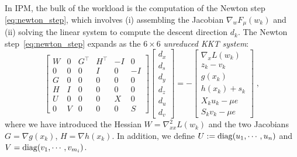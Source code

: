 In IPM, the bulk of the workload is the computation of the Newton
step \eqref{eq:newton_step}, which involves (i) assembling the Jacobian
$\nabla_w F_\mu(w_k)$ and (ii) solving the linear system to compute
the descent direction $d_k$.
The Newton step~\eqref{eq:newton_step} expands as the $6 \times 6$
\emph{unreduced KKT system}:
\begin{equation}
  \label{eq:kkt:unreduced}
  \tag{$K_3$}
  \begin{bmatrix}
    W & 0 & G^\top & H^\top & -I & 0 \\
    0 & 0 & 0 & I & 0 & -I \\
    G & 0 & 0 & 0 & 0 & 0 \\
    H & I & 0 & 0 & 0 & 0 \\
    U & 0 & 0 & 0 & X & 0 \\
    0 & V & 0 & 0 & 0 & S
  \end{bmatrix}
  \begin{bmatrix}
    d_x \\
    d_s \\
    d_y \\
    d_z \\
    d_u \\
    d_v
  \end{bmatrix}
  = - \begin{bmatrix}
    \nabla_x L(w_k) \\
       z_k - v_k  \\
       g(x_k)  \\
       h(x_k) + s_k  \\
       X_k u_k - \mu e  \\
       S_k v_k - \mu e
  \end{bmatrix} \; ,
\end{equation}
where we have introduced the Hessian $W = \nabla^2_{x x} L(w_k)$ and
the two Jacobians $G = \nabla g(x_k)$, $H = \nabla h(x_k)$.
In addition, we define $U := \operatorname{diag}(u_1, \cdots, u_n)$
and $V = \operatorname{diag}(v_1, \cdots, v_{m_i})$.

